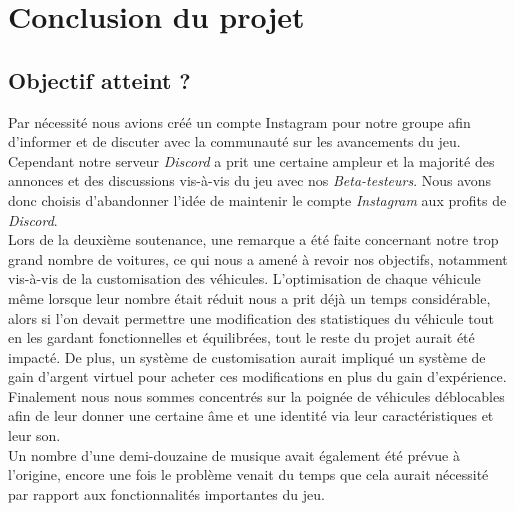 \documentclass[a4paper,12pt]{article}
\begin{document}
                \clearpage
    \section*{Conclusion du projet}
        \subsection{Objectif atteint ?}
        Par nécessité nous avions créé un compte Instagram pour notre groupe afin d'informer et de discuter avec la communauté sur les avancements du jeu. Cependant notre serveur \textsl{Discord} a prit une certaine ampleur et la majorité des annonces et des discussions vis-à-vis du jeu avec nos \textsl{Beta-testeurs}. Nous avons donc choisis d'abandonner l'idée de maintenir le compte \textsl{Instagram} aux profits de \textsl{Discord}.\\
        Lors de la deuxième soutenance, une remarque a été faite concernant notre trop grand nombre de voitures, ce qui nous a amené à revoir nos objectifs, notamment vis-à-vis de la customisation des véhicules. L'optimisation de chaque véhicule même lorsque leur nombre était réduit nous a prit déjà un temps considérable, alors si l'on devait permettre une modification des statistiques du véhicule tout en les gardant fonctionnelles et équilibrées, tout le reste du projet aurait été impacté. De plus, un système de customisation aurait impliqué un système de gain d'argent virtuel pour acheter ces modifications en plus du gain d'expérience. Finalement nous nous sommes concentrés sur la poignée de véhicules déblocables afin de leur donner une certaine âme et une identité via leur caractéristiques et leur son.\\
        Un nombre d'une demi-douzaine de musique avait également été prévue à l'origine, encore une fois le problème venait du temps que cela aurait nécessité par rapport aux fonctionnalités importantes du jeu.
        
\end{document}
